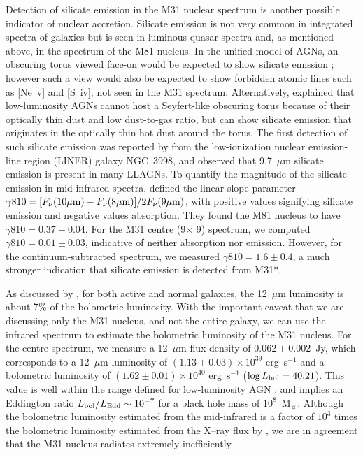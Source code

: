 Detection of silicate emission in the M31 nuclear spectrum is another possible indicator of nuclear accretion.
Silicate emission is not very common in integrated spectra of galaxies \citep{Spoon2007} but is seen in luminous 
quasar spectra \citep{Hill14} and, as mentioned above, in the spectrum of the M81 nucleus. 
In the unified model of AGNs, an obscuring torus viewed face-on would be expected to show silicate emission
\citep{AGNtypes1995, AGNref}; however such a view would also be expected to show forbidden atomic lines such as [Ne~{\sc v}] and [S~{\sc iv}],
not seen in the M31 spectrum. Alternatively, \citet{Mason2012} explained that low-luminosity AGNs cannot 
host a Seyfert-like obscuring torus because of their optically thin dust and low dust-to-gas ratio, but can show
silicate emission that originates in the optically thin hot dust around the torus.  The first detection of such silicate emission was 
reported by \citet{Sturm2005} from the low-ionization nuclear emission-line region (LINER) galaxy NGC~3998, and 
\citealt{Mason2012}  observed that  9.7~$\mu$m silicate emission is present in many LLAGNs. 
To quantify the magnitude of the silicate emission in mid-infrared spectra, \citet{Smith2010} defined
the linear slope parameter $\gamma810 =[F_{\nu}(10\mu{\rm m}) -F_{\nu}(8\mu{\rm m})]/2F_{\nu}(9\mu{\rm m})$,
with positive values signifying silicate emission and negative values absorption. They found the M81 nucleus to have
$\gamma810=0.37\pm0.04$. For the M31 centre (9\arcsec $\times$ 9\arcsec) spectrum, we computed  $\gamma810 =0.01\pm 0.03$,
indicative of neither absorption nor emission. However, for the continuum-subtracted spectrum, we measured   $\gamma810 =1.6\pm 0.4$,
a much stronger indication that silicate emission is detected from M31*.

As discussed by \citet{spinoglio95}, for both active and normal galaxies, the 12~$\mu$m luminosity 
is about 7\% of the bolometric luminosity. With the important caveat that we are discussing only the M31 nucleus,
and not the entire galaxy, we  can use the infrared spectrum to estimate the bolometric luminosity  of the M31 nucleus.
For the centre spectrum, we measure a 12~$\mu$m flux density of 
$0.062 \pm 0.002$~Jy, which corresponds to a 12~$\mu$m luminosity of $(1.13\pm0.03) \times10^{39}$ erg~s$^{-1}$ and a bolometric luminosity
of  $(1.62\pm0.01) \times10^{40}$ erg~s$^{-1}$ ($\log L_{\rm bol} = 40.21$). 
This value is well within the range defined for low-luminosity AGN \citep[$\log L_{\rm bol} <42$][]{Mason2012}, and
implies an Eddington ratio $L_{\rm bol}/L_{\rm Edd} \sim 10^{-7}$ for a black hole mass of $10^8$~M$_{\sun}$. 
Although the bolometric luminosity estimated from the mid-infrared is a factor of $10^3$ times the bolometric
luminosity estimated from the X--ray flux by \citet{Li09}, we are in agreement that the M31 nucleus radiates extremely inefficiently.

